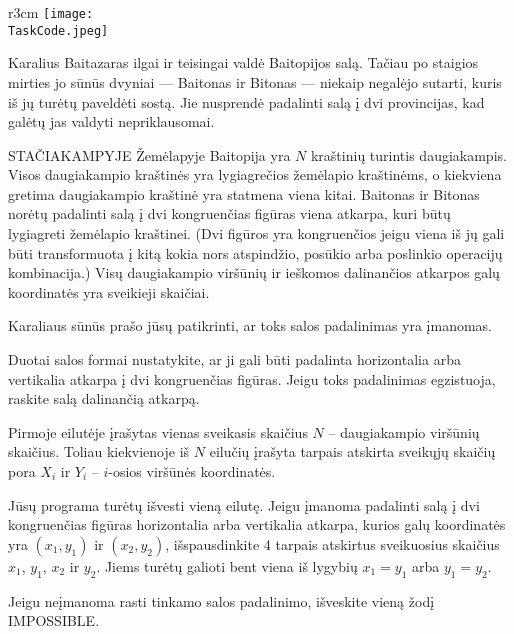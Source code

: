 \documentclass{boi2014-lt}
\renewcommand{\TaskCode}{demarcation}
\begin{document}
    \begin{wrapfigure}{r}{3cm}
        \vspace{-24pt}
		\texttt{[image: \\TaskCode.jpeg]}
	\end{wrapfigure}

    Karalius Baitazaras ilgai ir teisingai valdė Baitopijos salą. Tačiau po
    staigios mirties jo sūnūs dvyniai --- Baitonas ir Bitonas --- niekaip
    negalėjo sutarti, kuris iš jų turėtų paveldėti sostą. Jie nusprendė
    padalinti salą į dvi provincijas, kad galėtų jas valdyti nepriklausomai.
 
    STAČIAKAMPYJE Žemėlapyje Baitopija yra $N$ kraštinių turintis daugiakampis.
    Visos daugiakampio kraštinės yra lygiagrečios žemėlapio kraštinėms, o
    kiekviena gretima daugiakampio kraštinė yra statmena viena kitai. Baitonas ir
    Bitonas norėtų padalinti salą į dvi kongruenčias figūras viena atkarpa, kuri
    būtų lygiagreti žemėlapio kraštinei. (Dvi figūros yra kongruenčios jeigu
    viena iš jų gali būti transformuota į kitą kokia nors atspindžio, posūkio
    arba poslinkio operacijų kombinacija.) Visų daugiakampio viršūnių ir
    ieškomos dalinančios atkarpos galų koordinatės yra sveikieji skaičiai.
 
    Karaliaus sūnūs prašo jūsų patikrinti, ar toks salos padalinimas yra
    įmanomas.

    \Task
    Duotai salos formai nustatykite, ar ji gali būti padalinta horizontalia arba
    vertikalia atkarpa į dvi kongruenčias figūras. Jeigu toks padalinimas
    egzistuoja, raskite salą dalinančią atkarpą.

    \Input
    Pirmoje eilutėje įrašytas vienas sveikasis skaičius $N$ -- daugiakampio
    viršūnių skaičius. Toliau kiekvienoje iš $N$ eilučių įrašyta tarpais atskirta sveikųjų skaičių pora $X_i$ ir $Y_i$ -- $i$-osios viršūnės koordinatės.

	\Output
    Jūsų programa turėtų išvesti vieną eilutę. Jeigu įmanoma padalinti salą į dvi
    kongruenčias figūras horizontalia arba vertikalia atkarpa, kurios galų
    koordinatės yra $(x_1, y_1)$ ir $(x_2, y_2)$, išspausdinkite $4$ tarpais
    atskirtus sveikuosius skaičius $x_1$, $y_1$, $x_2$ ir $y_2$. Jiems turėtų
    galioti bent viena iš lygybių $x_1 = y_1$ arba $y_1 = y_2$.

	Jeigu neįmanoma rasti tinkamo salos padalinimo, išveskite vieną žodį
	IMPOSSIBLE.
\end{document}
